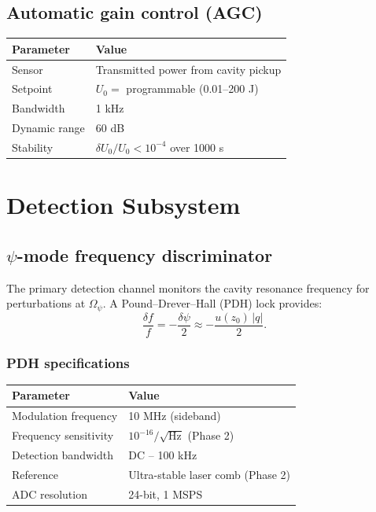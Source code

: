 \documentclass[12pt,letterpaper]{article}
\begin{document}
\subsection{Automatic gain control (AGC)}

\begin{tabular}{ll}
\toprule
Parameter & Value \\
\midrule
Sensor & Transmitted power from cavity pickup \\
Setpoint & $U_0 = $ programmable (0.01--200 J) \\
Bandwidth & 1 kHz \\
Dynamic range & 60 dB \\
Stability & $\delta U_0/U_0 < 10^{-4}$ over 1000 s \\
\bottomrule
\end{tabular}

\section{Detection Subsystem}

\subsection{$\psi$-mode frequency discriminator}

The primary detection channel monitors the cavity resonance frequency
for perturbations at $\Omega_\psi$.  A Pound--Drever--Hall (PDH) lock
provides:
\begin{equation}
  \frac{\delta f}{f} = -\frac{\delta\psi}{2}
  \approx -\frac{u(z_0)\,|q|}{2}.
\end{equation}

\subsubsection{PDH specifications}

\begin{tabular}{ll}
\toprule
Parameter & Value \\
\midrule
Modulation frequency & 10 MHz (sideband) \\
Frequency sensitivity & $10^{-16}/\sqrt{\text{Hz}}$ (Phase 2) \\
Detection bandwidth & DC -- 100 kHz \\
Reference & Ultra-stable laser comb (Phase 2) \\
ADC resolution & 24-bit, 1 MSPS \\
\bottomrule
\end{tabular}
\end{document}
